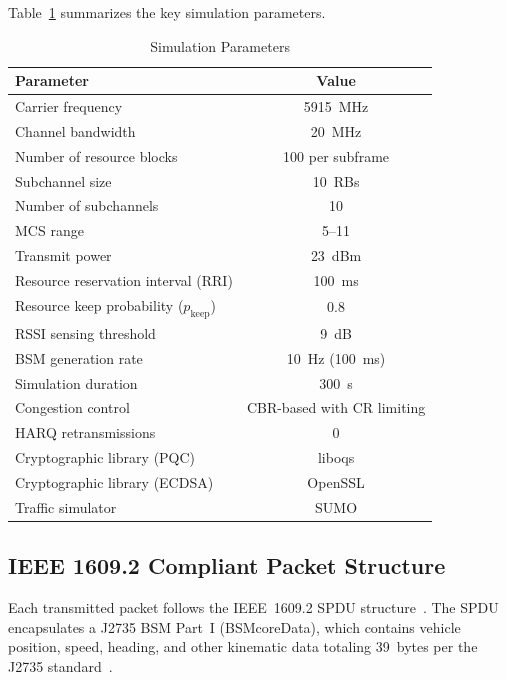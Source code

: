 \documentclass[letterpaper,journal]{IEEEtran}
\begin{document}
Table~\ref{tab:sim_params} summarizes the key simulation parameters.

\begin{table}[!htbp]
    \caption{Simulation Parameters}
    \label{tab:sim_params}
    \centering
    \begin{tabular}{lc}
    \toprule
    \textbf{Parameter} & \textbf{Value} \\
    \midrule
    Carrier frequency          & 5915~MHz \\
    Channel bandwidth          & 20~MHz \\
    Number of resource blocks  & 100 per subframe \\
    Subchannel size            & 10~RBs \\
    Number of subchannels      & 10 \\
    MCS range                  & 5--11 \\
    Transmit power             & 23~dBm \\
    Resource reservation interval (RRI) & 100~ms \\
    Resource keep probability ($p_\text{keep}$) & 0.8 \\
    RSSI sensing threshold     & 9~dB \\
    BSM generation rate        & 10~Hz (100~ms) \\
    Simulation duration        & 300~s \\
    Congestion control         & CBR-based with CR limiting \\
    HARQ retransmissions       & 0 \\
    Cryptographic library (PQC)  & liboqs \\
    Cryptographic library (ECDSA) & OpenSSL \\
    Traffic simulator          & SUMO \\
    \bottomrule
    \end{tabular}
\end{table}

\subsection{IEEE 1609.2 Compliant Packet Structure}
\label{sec:packet_structure}

Each transmitted packet follows the IEEE~1609.2 SPDU structure~\cite{ieee_16092}. The SPDU encapsulates a J2735 BSM Part~I (BSMcoreData), which contains vehicle position, speed, heading, and other kinematic data totaling 39~bytes per the J2735 standard~\cite{sae_j2735}.
\end{document}

